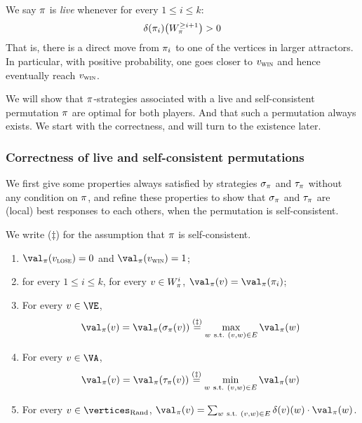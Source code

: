 We say $\pi$ is \emph{live} whenever for every $1 \le i \le k$:
\[
\delta(\pi_i)\big(W_\pi^{\ge i+1}\big)>0
\]
That is, there is a direct move from $\pi_i$ to one of the vertices
in larger attractors. In particular, with positive probability, one
goes closer to $v_{\textsc{win}}$ and hence eventually reach $v_{\textsc{win}}$.

\medskip We will show that $\pi$-strategies associated with a live
and self-consistent permutation $\pi$ are optimal for both players.
And that such a permutation always exists. We start with the
correctness, and will turn to the existence later.


\subsubsection{Correctness of live and self-consistent permutations}

We first give some properties always satisfied by strategies
$\sigma_\pi$ and $\tau_\pi$ without any condition on $\pi$, and
refine these properties to show that $\sigma_\pi$ and $\tau_\pi$
are (local) best responses to each others, when the permutation is
self-consistent.

\begin{lemma}
\label{stoch:lemma2}
We write ($\ddag$) for the assumption that $\pi$ is self-consistent.
\begin{enumerate}
\item $\val_\perm(\vlose) = 0$ and $\val_\perm(\vwin) = 1$;
\item for every $1 \le i \le k$, for every $v \in W_\pi^i$,
  $\val_\perm(v) = \val_\perm(\perm_i)$;
\item For every $v \in \Evevertices$,
  \[
  \val_\perm(v) = \val_\perm(\sigma_\perm(v)) \stackrel{(\ddag)}{=}
  \max_{w\ \text{s.t.}\ (v,w) \in E} \val_\perm(w)
  \]
\item For every $v \in \Adamvertices$,
  \[
  \val_\perm(v) = \val_\perm(\tau_\perm(v)) \stackrel{(\ddag)}{=}
  \min_{w\ \text{s.t.}\ (v,w) \in E} \val_\perm(w)
  \]
\item For every $v \in \Randomvertices$, $\val_\perm(v) = \sum_{w\
    \text{s.t.}\ (v,w) \in E} \delta(v)(w) \cdot \val_\perm(w)$.
\end{enumerate}
\end{lemma}

